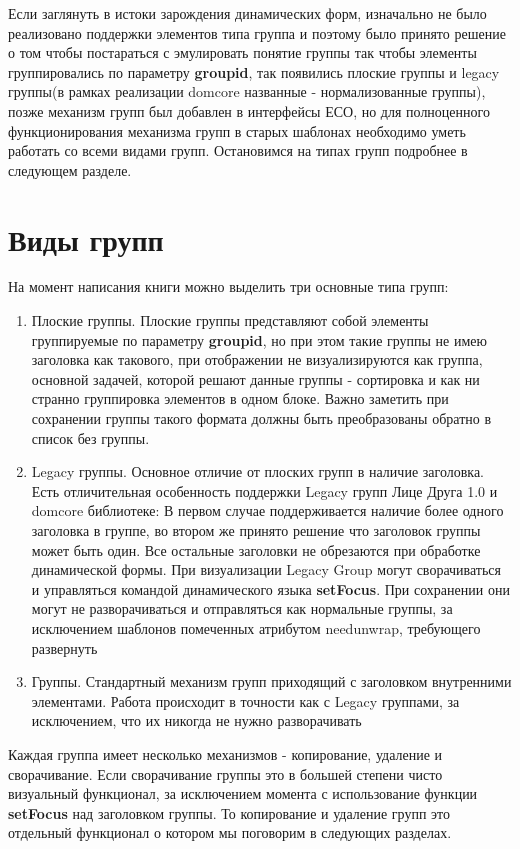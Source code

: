 \documentclass[../index.tex]{subfiles}
\begin{document}
Если заглянуть в истоки зарождения динамических форм, изначально не было реализовано поддержки элементов типа группа и поэтому было принято решение о том чтобы постараться с эмулировать понятие группы так чтобы элементы группировались по параметру \textbf{groupid}, так появились плоские группы и legacy группы(в рамках реализации domcore названные - нормализованные группы), позже механизм групп был добавлен в интерфейсы ЕСО, но для полноценного функционирования механизма групп в старых шаблонах необходимо уметь работать со всеми видами групп. Остановимся на типах групп подробнее в следующем разделе.
\section{Виды групп}
    На момент написания книги можно выделить три основные типа групп:
\begin{enumerate}
    \item Плоские группы. Плоские группы представляют собой элементы группируемые по параметру \textbf{groupid}, но при этом такие группы не имею заголовка как такового, при отображении не визуализируются как группа, основной задачей, которой решают данные группы - сортировка и как ни странно группировка элементов в одном блоке. Важно заметить при сохранении группы такого формата должны быть преобразованы обратно в список без группы.
    \item Legacy группы. Основное отличие от плоских групп в наличие заголовка. Есть отличительная особенность поддержки  Legacy групп Лице Друга 1.0 и domcore библиотеке: В первом случае поддерживается наличие более одного заголовка в группе, во втором же принято решение что заголовок группы может быть один. Все остальные заголовки не обрезаются при обработке динамической формы. При визуализации Legacy Group могут сворачиваться и управляться командой динамического языка \textbf{setFocus}. При сохранении они могут не разворачиваться и отправляться как нормальные группы, за исключением шаблонов помеченных атрибутом needunwrap, требующего развернуть
    \item Группы. Стандартный механизм групп приходящий с заголовком внутренними элементами. Работа происходит в точности как с Legacy группами, за исключением, что их никогда не нужно разворачивать
\end{enumerate}
    Каждая группа имеет несколько механизмов - копирование, удаление и сворачивание. Если сворачивание группы это в большей степени чисто визуальный функционал, за исключением момента с использование функции \textbf{setFocus} над  заголовком группы. То копирование и удаление групп это отдельный функционал о котором мы поговорим в следующих разделах.
\end{document}
